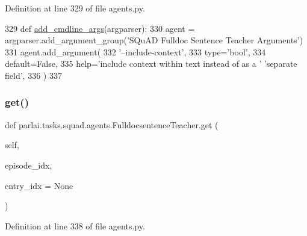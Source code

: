 Definition at line 329 of file agents.\+py.


\begin{DoxyCode}
329     \textcolor{keyword}{def }\hyperlink{namespaceparlai_1_1agents_1_1drqa_1_1config_a62fdd5554f1da6be0cba185271058320}{add\_cmdline\_args}(argparser):
330         agent = argparser.add\_argument\_group(\textcolor{stringliteral}{'SQuAD Fulldoc Sentence Teacher Arguments'})
331         agent.add\_argument(
332             \textcolor{stringliteral}{'--include-context'},
333             type=\textcolor{stringliteral}{'bool'},
334             default=\textcolor{keyword}{False},
335             help=\textcolor{stringliteral}{'include context within text instead of as a '} \textcolor{stringliteral}{'separate field'},
336         )
337 
\end{DoxyCode}
\mbox{\label{classparlai_1_1tasks_1_1squad_1_1agents_1_1FulldocsentenceTeacher_a60f31f40d228baf2a27eb4e1e2e1c213}} 
\subsubsection{\texorpdfstring{get()}{get()}}
{\footnotesize\ttfamily def parlai.\+tasks.\+squad.\+agents.\+Fulldocsentence\+Teacher.\+get (\begin{DoxyParamCaption}\item[{}]{self,  }\item[{}]{episode\+\_\+idx,  }\item[{}]{entry\+\_\+idx = {\ttfamily None} }\end{DoxyParamCaption})}



Definition at line 338 of file agents.\+py.


